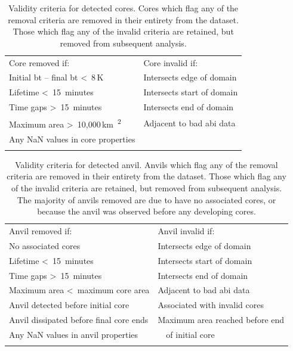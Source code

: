 \begin{table}[tb]
\centering
\begin{tabular}{ll}
\tophline
Core removed if:                                                    & Core invalid if: \\
\middlehline
Initial \acrshort{bt} -- final \acrshort{bt} \textless~8\,\unit{K}  & Intersects edge of domain \\
Lifetime \textless~15~minutes                                       & Intersects start of domain \\
Time gaps \textgreater~15~minutes                                   & Intersects end of domain \\
Maximum area \textgreater~10,000\,\unit{km\textsuperscript{2}}      & Adjacent to bad \acrshort{abi} data \\
Any NaN values in core properties                                   & \\
\bottomhline
\end{tabular}
\caption[
Validity criteria for detected cores
]{
Validity criteria for detected cores. Cores which flag any of the removal criteria are removed in their entirety from the dataset. Those which flag any of the invalid criteria are retained, but removed from subsequent analysis.}
\label{table:core_validity_criteria}
\end{table}


\begin{table}[tb]
\centering
\begin{tabular}{ll}
\tophline
Anvil removed if:                               & Anvil invalid if: \\
\middlehline
No associated cores                             & Intersects edge of domain \\
Lifetime \textless~15~minutes                   & Intersects start of domain \\             
Time gaps \textgreater~15~minutes               & Intersects end of domain \\
Maximum area \textless~maximum core area        & Adjacent to bad \acrshort{abi} data \\
Anvil detected before initial core              & Associated with invalid cores \\
Anvil dissipated before final core ends         & Maximum area reached before end \\
Any NaN values in anvil properties              & ~~of initial core \\
\bottomhline
\end{tabular}
\caption[
Validity criteria for detected anvils
]{
Validity criteria for detected anvil. Anvils which flag any of the removal criteria are removed in their entirety from the dataset. Those which flag any of the invalid criteria are retained, but removed from subsequent analysis. The majority of anvils removed are due to have no associated cores, or because the anvil was observed before any developing cores.}
\label{table:anvil_validity_criteria}
\end{table}


